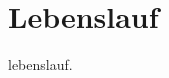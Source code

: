 \thispagestyle{empty}
\section{Lebenslauf}
\vspace*{1em}


\vspace*{3em}

lebenslauf.
    
\vspace*{3em}
